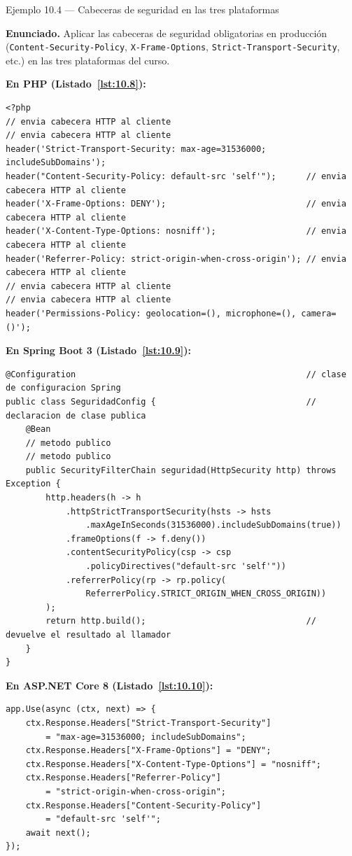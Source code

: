 \documentclass[11pt,a4paper,openany]{book}
\begin{document}
\begin{cajaejemplo}{Ejemplo 10.4 --- Cabeceras de seguridad en las tres plataformas}

\textbf{Enunciado.} Aplicar las cabeceras de seguridad obligatorias en producción (\texttt{Content-Security-Policy}, \texttt{X-Frame-Options}, \texttt{Strict-Transport-Security}, etc.) en las tres plataformas del curso.

\textbf{En PHP (Listado~\ref{lst:10.8}):}
\begin{lstlisting}[style=php,numbers=none,caption={Ejemplo de PHP},label=lst:10.8]
<?php
// envia cabecera HTTP al cliente
// envia cabecera HTTP al cliente
header('Strict-Transport-Security: max-age=31536000; includeSubDomains');
header("Content-Security-Policy: default-src 'self'");      // envia cabecera HTTP al cliente
header('X-Frame-Options: DENY');                            // envia cabecera HTTP al cliente
header('X-Content-Type-Options: nosniff');                  // envia cabecera HTTP al cliente
header('Referrer-Policy: strict-origin-when-cross-origin'); // envia cabecera HTTP al cliente
// envia cabecera HTTP al cliente
// envia cabecera HTTP al cliente
header('Permissions-Policy: geolocation=(), microphone=(), camera=()');
\end{lstlisting}

\textbf{En Spring Boot 3 (Listado~\ref{lst:10.9}):}
\begin{lstlisting}[style=java,numbers=none,caption={Ejemplo de Java},label=lst:10.9]
@Configuration                                              // clase de configuracion Spring
public class SeguridadConfig {                              // declaracion de clase publica
    @Bean
    // metodo publico
    // metodo publico
    public SecurityFilterChain seguridad(HttpSecurity http) throws Exception {
        http.headers(h -> h
            .httpStrictTransportSecurity(hsts -> hsts
                .maxAgeInSeconds(31536000).includeSubDomains(true))
            .frameOptions(f -> f.deny())
            .contentSecurityPolicy(csp -> csp
                .policyDirectives("default-src 'self'"))
            .referrerPolicy(rp -> rp.policy(
                ReferrerPolicy.STRICT_ORIGIN_WHEN_CROSS_ORIGIN))
        );
        return http.build();                                // devuelve el resultado al llamador
    }
}
\end{lstlisting}

\textbf{En ASP.NET Core 8 (Listado~\ref{lst:10.10}):}
\begin{lstlisting}[style=cs,numbers=none,caption={Ejemplo de C\#},label=lst:10.10]
app.Use(async (ctx, next) => {
    ctx.Response.Headers["Strict-Transport-Security"]
        = "max-age=31536000; includeSubDomains";
    ctx.Response.Headers["X-Frame-Options"] = "DENY";
    ctx.Response.Headers["X-Content-Type-Options"] = "nosniff";
    ctx.Response.Headers["Referrer-Policy"]
        = "strict-origin-when-cross-origin";
    ctx.Response.Headers["Content-Security-Policy"]
        = "default-src 'self'";
    await next();
});
\end{lstlisting}
\end{cajaejemplo}
\end{document}
